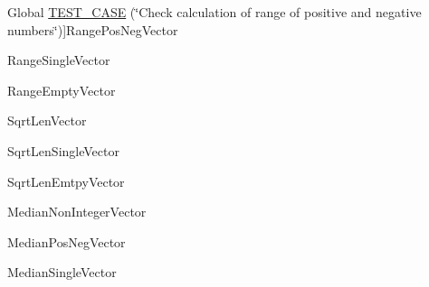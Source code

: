 \begin{DoxyRefList}
%
Global \mbox{\hyperlink{testMetrics_8cpp_ad5e0fee1e778479d616f9db505b1604c}{T\+E\+S\+T\+\_\+\+C\+A\+SE}} (\char`\"{}\+Check calculation of range of positive and negative numbers\char`\"{})]Range\+Pos\+Neg\+Vector  
\item[\label{test__test000022}%
\Hypertarget{test__test000022}%
Global \mbox{\hyperlink{testMetrics_8cpp_a9a1728a8603b5d5d93d66958e3edac07}{T\+E\+S\+T\+\_\+\+C\+A\+SE}} (\char`\"{}\+Check calculation of range of singularly occupied vector\char`\"{})]Range\+Single\+Vector  
\item[\label{test__test000021}%
\Hypertarget{test__test000021}%
Global \mbox{\hyperlink{testMetrics_8cpp_ae4e75ab4f6bbf2508894636e864ca5fa}{T\+E\+S\+T\+\_\+\+C\+A\+SE}} (\char`\"{}\+Check range of empty vector\char`\"{})]Range\+Empty\+Vector  
\item[\label{test__test000020}%
\Hypertarget{test__test000020}%
Global \mbox{\hyperlink{testMetrics_8cpp_aa08764ae97194a58f3e0538a50508789}{T\+E\+S\+T\+\_\+\+C\+A\+SE}} (\char`\"{}\+Check sqrt\+Len of longer vector\char`\"{})]Sqrt\+Len\+Vector  
\item[\label{test__test000019}%
\Hypertarget{test__test000019}%
Global \mbox{\hyperlink{testMetrics_8cpp_a74f6b459e9d50d4dd61636b961375d23}{T\+E\+S\+T\+\_\+\+C\+A\+SE}} (\char`\"{}\+Check sqrt\+Len of singularly occupied vector\char`\"{})]Sqrt\+Len\+Single\+Vector  
\item[\label{test__test000018}%
\Hypertarget{test__test000018}%
Global \mbox{\hyperlink{testMetrics_8cpp_af8ddf1c9d577df4c55c09fe60559d54b}{T\+E\+S\+T\+\_\+\+C\+A\+SE}} (\char`\"{}\+Check sqrt\+Len of empty vector\char`\"{})]Sqrt\+Len\+Emtpy\+Vector  
\item[\label{test__test000017}%
\Hypertarget{test__test000017}%
Global \mbox{\hyperlink{testMetrics_8cpp_ab70630a1c4e94d345bb446540949dd49}{T\+E\+S\+T\+\_\+\+C\+A\+SE}} (\char`\"{}\+Check calculation of median of non-\/integer reals\char`\"{})]Median\+Non\+Integer\+Vector  
\item[\label{test__test000016}%
\Hypertarget{test__test000016}%
Global \mbox{\hyperlink{testMetrics_8cpp_a7551e1fd55f4618e1cc92780505b3a6b}{T\+E\+S\+T\+\_\+\+C\+A\+SE}} (\char`\"{}\+Check calculation of median of positive and negative numbers\char`\"{})]Median\+Pos\+Neg\+Vector  
\item[\label{test__test000015}%
\Hypertarget{test__test000015}%
Global \mbox{\hyperlink{testMetrics_8cpp_abd0df56b26da56246dade8d85f0087d5}{T\+E\+S\+T\+\_\+\+C\+A\+SE}} (\char`\"{}\+Check calculation of median of singularly occupied vector\char`\"{})]Median\+Single\+Vector  

\end{DoxyRefList}
